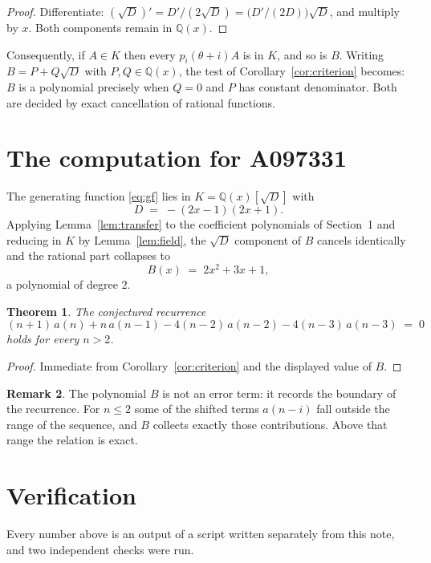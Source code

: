 \documentclass[11pt,a4paper]{article}
\theoremstyle{plain}
\newtheorem{theorem}{Theorem}
\theoremstyle{definition}
\newtheorem{remark}[theorem]{Remark}
\begin{document}
\begin{proof}
Differentiate: $(\sqrt{D})'=D'/(2\sqrt{D})=\bigl(D'/(2D)\bigr)\sqrt{D}$, and multiply by
$x$. Both components remain in $\mathbb{Q}(x)$.
\end{proof}

Consequently, if $A\in K$ then every $p_{i}(\theta+i)A$ is in $K$, and so is $B$. Writing
$B=P+Q\sqrt{D}$ with $P,Q\in\mathbb{Q}(x)$, the test of Corollary~\ref{cor:criterion}
becomes: $B$ is a polynomial precisely when $Q=0$ and $P$ has constant denominator. Both
are decided by exact cancellation of rational functions.

\section{The computation for A097331}

The generating function \eqref{eq:gf} lies in $K=\mathbb{Q}(x)[\sqrt{D}]$ with
\[
D \;=\; - \left(2 x - 1\right) \left(2 x + 1\right) .
\]
Applying Lemma~\ref{lem:transfer} to the coefficient polynomials of Section~1 and reducing
in $K$ by Lemma~\ref{lem:field}, the $\sqrt{D}$ component of $B$ cancels identically and
the rational part collapses to
\[
B(x)\;=\;2 x^{2} + 3 x + 1 ,
\]
a polynomial of degree $2$.

\begin{theorem}
The conjectured recurrence
\[
(n + 1)\,a(n) + n\,a(n-1) -  4 \left(n - 2\right)\,a(n-2) -  4 \left(n - 3\right)\,a(n-3) \;=\;0
\]
holds for every $n>2$.
\end{theorem}

\begin{proof}
Immediate from Corollary~\ref{cor:criterion} and the displayed value of $B$.
\end{proof}

\begin{remark}
The polynomial $B$ is not an error term: it records the boundary of the recurrence. For
$n\le2$ some of the shifted terms $a(n-i)$ fall outside the range of the sequence,
and $B$ collects exactly those contributions. Above that range the relation is exact.
\end{remark}

\section{Verification}

Every number above is an output of a script written separately from this note, and two
independent checks were run.
\end{document}
